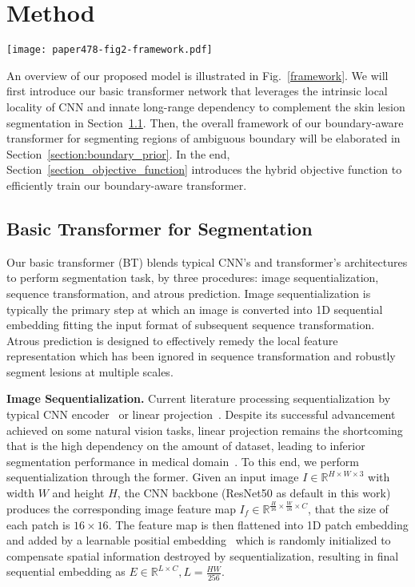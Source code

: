 \documentclass[runningheads]{paper478-llncs}
\begin{document}
\section{Method}

\begin{figure*}[t]
    \texttt{[image: paper478-fig2-framework.pdf]}
    \caption{An overview of the proposed Boundary-Aware Transformer framework.}
    \label{framework}
\end{figure*}

An overview of our proposed model is illustrated in Fig.~\ref{framework}.
We will first introduce our basic transformer network that leverages the intrinsic local locality of CNN and innate long-range dependency to complement the skin lesion segmentation in Section~\ref{section:trans_for_seg}.
Then, the overall framework of our boundary-aware transformer for segmenting regions of ambiguous boundary will be elaborated in Section~\ref{section:boundary_prior}. 
In the end, Section~\ref{section_objective_function} introduces the hybrid objective function to efficiently train our boundary-aware transformer.

\subsection{Basic Transformer for Segmentation}
\label{section:trans_for_seg}
Our basic transformer (BT) blends typical CNN's and transformer's architectures to perform segmentation task, by  three procedures: image sequentialization, sequence transformation, and atrous prediction. Image sequentialization is typically the primary step at which an image is converted into 1D sequential embedding fitting the input format of subsequent sequence transformation. 
Atrous prediction is designed to effectively remedy the local feature representation which has been ignored in sequence transformation and robustly segment lesions at multiple scales.

\textbf{Image Sequentialization.}
Current literature processing sequentialization by typical CNN encoder~\cite{carion2020detr,li2020sttr} or linear projection~\cite{dosovitskiy2020vit,zheng2020rethinking}.
Despite its successful advancement achieved on some natural vision tasks, linear projection remains the shortcoming that is the high dependency on the amount of dataset, leading to inferior segmentation performance in medical domain~\cite{chen2021transunet}. 
To this end, we perform sequentialization through the former.
Given an input image $I \in \mathbb{R}^{H \times W\times 3}$ with width $W$ and height $H$, the CNN backbone (ResNet50 as default in this work) produces the corresponding image feature map $I_{f} \in \mathbb{R}^{\tfrac{H}{16} \times \tfrac{W}{16}\times C}$, that the size of each patch is $16\times16$. 
The feature map is then flattened into 1D patch embedding and added by a learnable positial embedding~\cite{gehring2017convolutional} which is randomly initialized to compensate spatial information destroyed by sequentialization, resulting in final sequential embedding as $E \in \mathbb{R}^{L \times C}, L=\tfrac{HW}{256}$.
\end{document}
